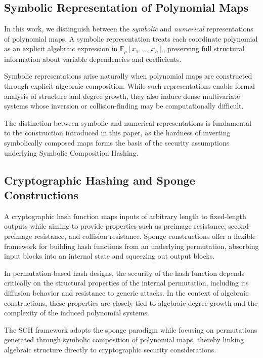 ﻿\documentclass[english]{aucmcs}
\newcommand{\Fp}{\mathbb{F}_p}
\begin{document}
\subsection{Symbolic Representation of Polynomial Maps}

In this work, we distinguish between the \emph{symbolic} and \emph{numerical} representations of polynomial maps. A symbolic representation treats each coordinate polynomial as an explicit algebraic expression in $\Fp[x_1, \ldots, x_n]$, preserving full structural information about variable dependencies and coefficients.

Symbolic representations arise naturally when polynomial maps are constructed through explicit algebraic composition. While such representations enable formal analysis of structure and degree growth, they also induce dense multivariate systems whose inversion or collision-finding may be computationally difficult.

The distinction between symbolic and numerical representations is fundamental to the construction introduced in this paper, as the hardness of inverting symbolically composed maps forms the basis of the security assumptions underlying Symbolic Composition Hashing.

\subsection{Cryptographic Hashing and Sponge Constructions}

A cryptographic hash function maps inputs of arbitrary length to fixed-length outputs while aiming to provide properties such as preimage resistance, second-preimage resistance, and collision resistance. Sponge constructions offer a flexible framework for building hash functions from an underlying permutation, absorbing input blocks into an internal state and squeezing out output blocks.

In permutation-based hash designs, the security of the hash function depends critically on the structural properties of the internal permutation, including its diffusion behavior and resistance to generic attacks. In the context of algebraic constructions, these properties are closely tied to algebraic degree growth and the complexity of the induced polynomial systems.

The SCH framework adopts the sponge paradigm while focusing on permutations generated through symbolic composition of polynomial maps, thereby linking algebraic structure directly to cryptographic security considerations.
\end{document}
